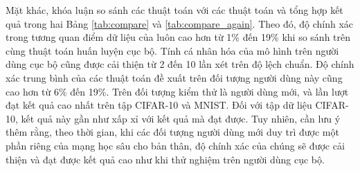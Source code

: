 \begin{table}[H]
    \centering
    \caption{Bảng độ chính xác (\%) của thuật toán FedPer và các thuật toán FedMeta-Per tính trên máy khách (dữ liệu Non-IID)}
    \label{tab:fedmetaper_client_acc}
\end{table}

Mặt khác, khóa luận so sánh các thuật toán  với các thuật toán  và tổng hợp kết quả trong hai Bảng \ref{tab:compare} và \ref{tab:compare_again}. Theo đó, độ chính xác trong tương quan điểm dữ liệu của  luôn cao hơn  từ 1\% đến 19\% khi so sánh trên cùng thuật toán huấn luyện cục bộ. Tính cá nhân hóa của mô hình trên người dùng cục bộ cũng được cải thiện từ 2 đến 10 lần xét trên độ lệch chuẩn. Độ chính xác trung bình của các thuật toán đề xuất trên đối tượng người dùng này cũng cao hơn từ 6\% đến 19\%. Trên đối tượng kiểm thử là người dùng mới,  và  lần lượt đạt kết quả cao nhất trên tập CIFAR-10 và MNIST. Đối với tập dữ liệu CIFAR-10, kết quả này gần như xấp xỉ với kết quả mà  đạt được. Tuy nhiên, cần lưu ý thêm rằng, theo thời gian, khi các đối tượng người dùng mới duy trì được một phần riêng của mạng học sâu cho bản thân, độ chính xác của chúng sẽ được cải thiện và đạt được kết quả cao như khi thử nghiệm trên người dùng cục bộ.

